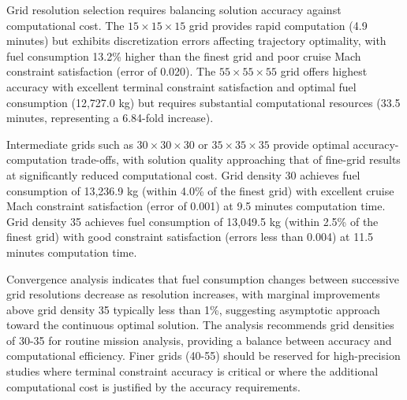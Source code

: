 
Grid resolution selection requires balancing solution accuracy against computational cost. The $15 \times 15 \times 15$ grid provides rapid computation (4.9 minutes) but exhibits discretization errors affecting trajectory optimality, with fuel consumption 13.2\% higher than the finest grid and poor cruise Mach constraint satisfaction (error of 0.020). The $55 \times 55 \times 55$ grid offers highest accuracy with excellent terminal constraint satisfaction and optimal fuel consumption (12,727.0 kg) but requires substantial computational resources (33.5 minutes, representing a 6.84-fold increase).

Intermediate grids such as $30 \times 30 \times 30$ or $35 \times 35 \times 35$ provide optimal accuracy-computation trade-offs, with solution quality approaching that of fine-grid results at significantly reduced computational cost. Grid density 30 achieves fuel consumption of 13,236.9 kg (within 4.0\% of the finest grid) with excellent cruise Mach constraint satisfaction (error of 0.001) at 9.5 minutes computation time. Grid density 35 achieves fuel consumption of 13,049.5 kg (within 2.5\% of the finest grid) with good constraint satisfaction (errors less than 0.004) at 11.5 minutes computation time.

Convergence analysis indicates that fuel consumption changes between successive grid resolutions decrease as resolution increases, with marginal improvements above grid density 35 typically less than 1\%, suggesting asymptotic approach toward the continuous optimal solution. The analysis recommends grid densities of 30-35 for routine mission analysis, providing a balance between accuracy and computational efficiency. Finer grids (40-55) should be reserved for high-precision studies where terminal constraint accuracy is critical or where the additional computational cost is justified by the accuracy requirements.
